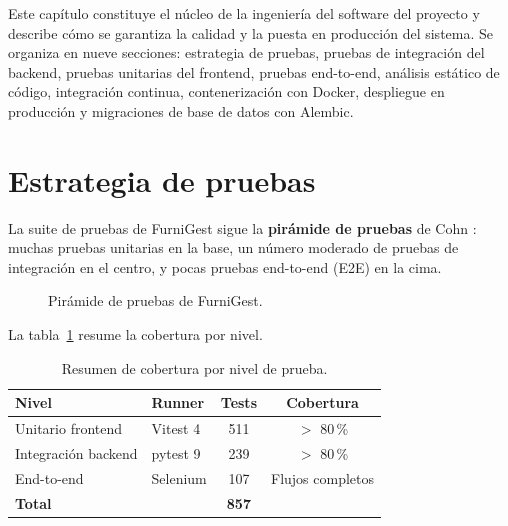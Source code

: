 \documentclass[12pt,twoside,titlepage]{report}
\begin{document}
Este capítulo constituye el núcleo de la ingeniería del software del proyecto y describe cómo se garantiza la calidad y la puesta en producción del sistema. Se organiza en nueve secciones: estrategia de pruebas, pruebas de integración del backend, pruebas unitarias del frontend, pruebas end-to-end, análisis estático de código, integración continua, contenerización con Docker, despliegue en producción y migraciones de base de datos con Alembic.


\section{Estrategia de pruebas}

La suite de pruebas de FurniGest sigue la \textbf{pirámide de pruebas} de Cohn \cite{cohn}: muchas pruebas unitarias en la base, un número moderado de pruebas de integración en el centro, y pocas pruebas end-to-end (E2E) en la cima.

\begin{figure}[H]
  \centering
  \caption{Pirámide de pruebas de FurniGest.}
  \label{fig:piramide_tests}
\end{figure}

La tabla~\ref{tab:cobertura_global} resume la cobertura por nivel.

\begin{table}[H]
  \centering
  \caption{Resumen de cobertura por nivel de prueba.}
  \label{tab:cobertura_global}
  \begin{tabular}{llcc}
    \toprule
    \textbf{Nivel} & \textbf{Runner} & \textbf{Tests} & \textbf{Cobertura} \\
    \midrule
    Unitario frontend      & Vitest 4          & 511  & $>$ 80\,\% \\
    Integración backend    & pytest 9          & 239  & $>$ 80\,\% \\
    End-to-end             & Selenium          & 107  & Flujos completos \\
    \midrule
    \textbf{Total}      &                & \textbf{857} & \\
    \bottomrule
  \end{tabular}
\end{table}
\end{document}
